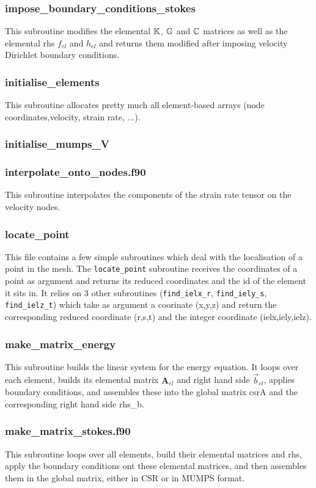  \subsubsection{impose\_boundary\_conditions\_stokes}
 This subroutine modifies the elemental ${\mathbb{K}}$, ${\mathbb{G}}$ and ${\mathbb{C}}$ matrices as well as the 
 elemental rhs $f_{el}$ and $h_{el}$ and returns them modified after imposing
 velocity Dirichlet boundary conditions.
 \subsubsection{initialise\_elements}
 This subroutine allocates pretty much all element-based arrays (node coordinates,velocity,
 strain rate, ...).
 \subsubsection{initialise\_mumps\_V}

 \subsubsection{interpolate\_onto\_nodes.f90}
 This subroutine interpolates the components of the strain rate tensor on the velocity nodes.
 \subsubsection{locate\_point}
 This file contains a few simple subroutines which deal with the localisation of a point 
 in the mesh. The {\tt locate\_point} subroutine receives the coordinates of a point as argument 
 and returns its reduced coordinates and the id of the element it sits in.
 It relies on 3 other subroutines ({\tt find\_ielx\_r}, {\tt find\_iely\_s}, {\tt find\_ielz\_t})
 which take as argument a coorinate (x,y,z) and return the corresponding reduced
 coordinate (r,s,t) and the integer coordinate (ielx,iely,ielz).
 \subsubsection{make\_matrix\_energy}
 This subroutine builds the linear system for the energy equation. 
 It loops over each element, builds its elemental matrix ${\bm A}_{el}$
 and right hand side $\vec{b}_{el}$, applies boundary conditions, 
 and assembles these into the global matrix csrA and the corresponding 
 right hand side rhs\_b. 
 \subsubsection{make\_matrix\_stokes.f90}
 This subroutine loops over all elements, build their elemental matrices and rhs, 
 apply the boundary conditions ont these elemental matrices, and then 
 assembles them in the global matrix, either in CSR or in MUMPS format.
